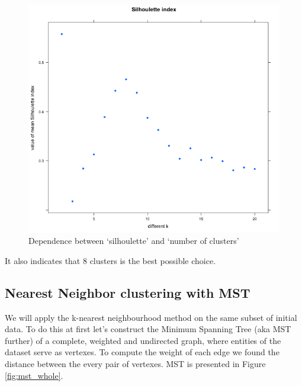 {{\begin{figure}[h]
	\centering
	\begin{minipage}[h]{0.49\linewidth}
		\includegraphics[width=1.2\linewidth]{images/silhoulette_index.png}
	\end{minipage}
	\caption{Dependence between `silhoulette' and `number of clusters'}
	\label{fig:silhoulette_index}	
\end{figure}

It also indicates that 8 clusters is the best possible choice.



\subsection{Nearest Neighbor clustering with MST}
	We will apply the k-nearest neighbourhood method on the same subset of initial data. To do this at first let's construct the Minimum Spanning Tree (aka MST further) of a complete, weighted and undirected graph, where entities of the dataset serve as vertexes. To compute the weight of each edge we found the distance between the every pair of vertexes. MST is presented in Figure \ref{fig:mst_whole}.

}}

